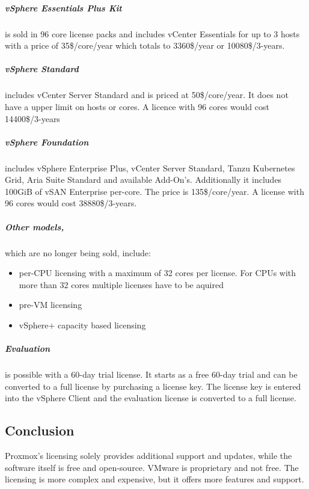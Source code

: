 \subparagraph{vSphere Essentials Plus Kit}
is sold in 96 core license packs and includes vCenter Essentials for up to 3 hosts with a price of \num{35}\$/core/year which totals to \num{3360}\$/year or \num{10080}\$/3-years.

\subparagraph{vSphere Standard} includes vCenter Server Standard and is priced at \num{50}\$/core/year. It does not have a upper limit on hosts or cores. A licence with 96 cores would cost \num{14400}\$/3-years 

\subparagraph{vSphere Foundation} includes vSphere Enterprise Plus, vCenter Server Standard, Tanzu Kubernetes Grid, Aria Suite Standard and available Add-On's. Additionally it includes 100GiB of vSAN Enterprise per-core. The price is \num{135}\$/core/year. 
A license with 96 cores would cost \num{38880}\$/3-years.


\subparagraph{Other models,} which are no longer being sold, include: 
\begin{itemize}
	\item per-CPU licensing with a maximum of 32 cores per license. For CPUs with more than 32 cores multiple licenses have to be aquired
	\item pre-VM licensing
	\item vSphere+ capacity based licensing
\end{itemize}

\subparagraph{Evaluation} is possible with a 60-day trial license.
It starts as a free 60-day trial and can be converted to a full license by purchasing a license key. The license key is entered into the vSphere Client and the evaluation license is converted to a full license.

\subsection{Conclusion}

Proxmox's licensing solely provides additional support and updates, while the software itself is free and open-source. 
VMware is proprietary and not free. The licensing is more complex and expensive, but it offers more features and support. 
